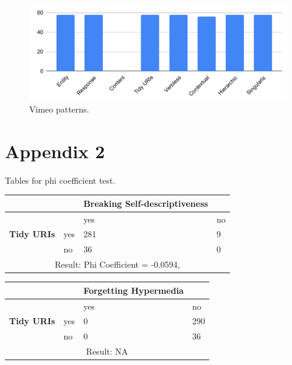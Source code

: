 \documentclass[a4paper,12pt]{article}
\begin{document}
\begin{figure}[!h]
\begin{center}
\includegraphics[keepaspectratio,scale=0.8]{Template_report_LaTeX_EN/img/barchart/vimeoBarPatt.pdf}
\caption{Vimeo patterns.}
\label{fig:vimeoBarPatt}
\end{center}
\end{figure}

\clearpage

\section{Appendix 2} 
Tables for phi coefficient test.

\begin{center}
  \begin{tabular}{| p{60mm} | p{10mm} | p{35mm} | p{35mm} |}
  \hline
   & & \textbf{Breaking Self-descriptiveness} &
  \\
  \hline
  & & yes & no
  \\
  \hline
  \textbf{Tidy URIs} & yes & 281 & 9
  \\
  \hline
   & no & 36 & 0
  \\
  \hline
  \multicolumn{4}{|c|}{Result: Phi Coefficient = -0.0594, }
  \\ \hline
  \end{tabular}
  \end{center}

\begin{center}
  \begin{tabular}{| p{60mm} | p{10mm} | p{35mm} | p{35mm} |}
  \hline
   & & \textbf{Forgetting Hypermedia} &
  \\
  \hline
  & & yes & no
  \\
  \hline
  \textbf{Tidy URIs} & yes & 0 & 290
  \\
  \hline
   & no & 0 & 36
  \\
  \hline
  \multicolumn{4}{|c|}{Result: NA}
  \\ \hline
  \end{tabular}
  \end{center}
\end{document}
